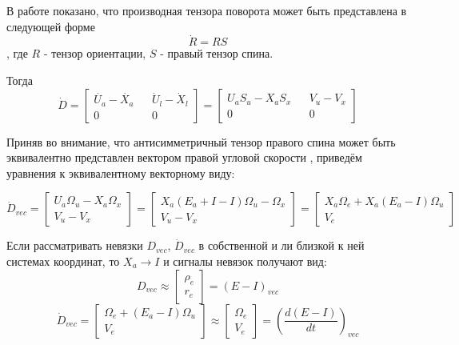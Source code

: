 \documentclass[a4paper]{article}
\begin{document}
В работе \cite{zhilin} показано, что производная тензора поворота может быть представлена в следующей форме
\begin{equation} \dot{R} = R S \end{equation}
, где $R$ - тензор ориентации, $S$ - правый тензор спина.

Тогда 
\begin{equation} 
\dot{D} = \begin{bmatrix}\dot{U_a} - \dot{X_a}&&\dot{U}_l-\dot{X}_l\\0&&0\end{bmatrix} 
= \begin{bmatrix}U_aS_u - X_aS_x&&V_u-V_x\\0&&0\end{bmatrix}\end{equation}

Приняв во внимание, что антисимметричный тензор правого спина может быть эквивалентно представлен вектором правой угловой скорости \cite{zhilin}, приведём уравнения к эквивалентному векторному виду:

\begin{equation}\dot{D}_{vec} = \begin{bmatrix}U_a\Omega_u-X_a\Omega_x\\ V_u-V_x\end{bmatrix}= \begin{bmatrix}X_a(E_a+I-I)\Omega_u-\Omega_x\\ V_u-V_x\end{bmatrix}=\begin{bmatrix}X_a\Omega_e + X_a(E_a-I)\Omega_u\\ V_e\end{bmatrix}\end{equation}

Если рассматривать невязки $D_{vec}$, $\dot{D}_{vec}$ в собственной и ли близкой к ней системах координат, то $X_a\rightarrow I$ и сигналы невязок получают вид:
\begin{equation} D_{vec} \approx \begin{bmatrix}\rho_e\\r_e\end{bmatrix} = (E-I)_{vec} \end{equation}
\begin{equation}\dot{D}_{vec} = \begin{bmatrix}\Omega_e + (E_a-I)\Omega_u\\ V_e\end{bmatrix}\approx\begin{bmatrix}\Omega_e\\ V_e\end{bmatrix} = \left(\frac{d(E-I)}{dt}\right)_{vec}
\end{equation}
\end{document}
